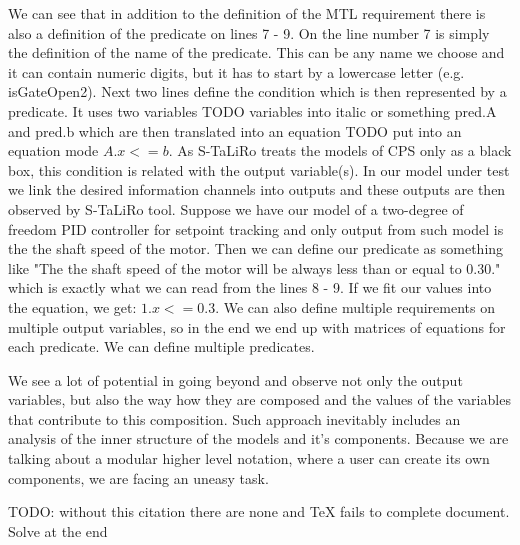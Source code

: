 

We can see that in addition to the definition of the MTL requirement there is also a definition of the predicate on lines 7 - 9. On the line number 7 is simply the definition of the name of the predicate. This can be any name we choose and it can contain numeric digits, but it has to start by a lowercase letter (e.g. isGateOpen2). Next two lines define the condition which is then represented by a predicate. It uses two variables TODO variables into italic or something pred.A and pred.b which are then translated into an equation TODO put into an equation mode $A.x <= b$. As S-TaLiRo treats the models of CPS only as a black box, this condition is related with the output variable(s). In our model under test we link the desired information channels into outputs and these outputs are then observed by S-TaLiRo tool. Suppose we have our model of a two-degree of freedom PID controller for setpoint tracking and only output from such model is the the shaft speed of the motor. Then we can define our predicate as something like "The the shaft speed of the motor will be always less than or equal to 0.30." which is exactly what we can read from the lines 8 - 9. If we fit our values into the equation, we get: $1.x <= 0.3$. We can also define multiple requirements on multiple output variables, so in the end we end up with matrices of equations for each predicate. We can define multiple predicates.

We see a lot of potential in going beyond and observe not only the output variables, but also the way how they are composed and the values of the variables that contribute to this composition. Such approach inevitably includes an analysis of the inner structure of the models and it's components. Because we are talking about a modular higher level notation, where a user can create its own components, we are facing an uneasy task.

TODO: without this citation there are none and TeX fails to complete document. Solve at the end
\cite{ieee754}